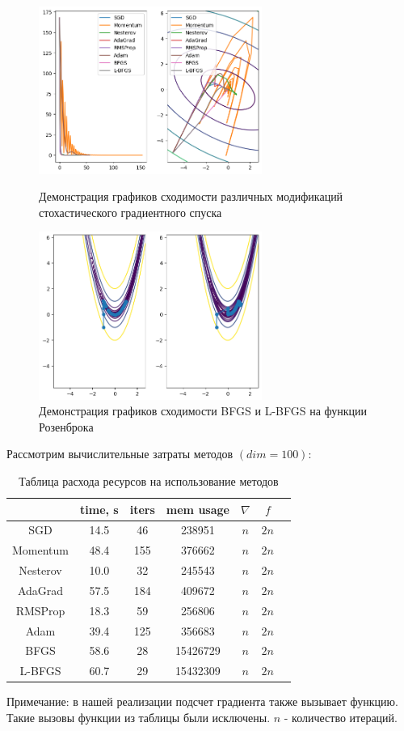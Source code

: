 \documentclass[a4paper,14pt,oneside,openany]{memoir}
\begin{document}
	\begin{figure}[ht]
		\centering
		\includegraphics[width=0.65\textwidth]{img/3_3_1.png}
  \caption{Демонстрация графиков сходимости различных модификаций стохастического градиентного спуска}
  \includegraphics[width=0.65\textwidth]{img/3_3_2.png}
    \caption{Демонстрация графиков сходимости BFGS и L-BFGS на функции Розенброка}
	\end{figure}
	
	
	\begin{table}
	Рассмотрим вычислительные затраты методов $(dim = 100)$:
	\centering
	\begin{tabular}{|c|c|c|c|c|c|c| }
	\hline
	& time, s & iters & mem usage & $\nabla$ & $f$ \\
	\hline
	SGD & 14.5 &46 & 238951 & $n$ & $2n$ \\
	\hline
	Momentum & 48.4 &155 & 376662 & $n$ & $2n$ \\
	\hline
	Nesterov & 10.0 &32 & 245543 & $n$ & $2n$ \\ 
	\hline
	AdaGrad & 57.5 &184 & 409672 & $n$ & $2n$ \\
	\hline
	RMSProp & 18.3 &59 & 256806 & $n$ & $2n$ \\
	\hline
	Adam & 39.4 &125 & 356683 & $n$ & $2n$ \\
	\hline
	BFGS & 58.6 &28 & 15426729 & $n$ & $2n$ \\
	\hline
	L-BFGS & 60.7 &29 & 15432309 & $n$ & $2n$ \\
	\hline
	\end{tabular}
	\caption{Таблица расхода ресурсов на использование методов}
	Примечание: в нашей реализации подсчет градиента также вызывает функцию. Такие вызовы функции из таблицы были исключены. $n$ - количество итераций.
	\end{table}
	
\end{document}

